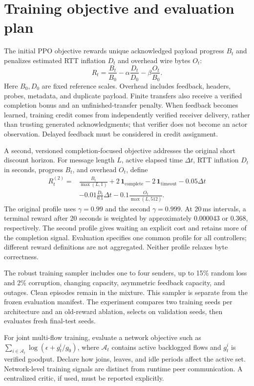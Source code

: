 \documentclass[11pt]{article}
\begin{document}
\section{Training objective and evaluation plan}
The initial PPO objective rewards unique acknowledged payload progress $B_t$
and penalizes estimated RTT inflation $D_t$ and overhead wire bytes $O_t$:
\begin{equation}
 R_t = \frac{B_t}{B_0}-\alpha\frac{D_t}{D_0}
       -\beta\frac{O_t}{B_0}.
\end{equation}
Here $B_0,D_0$ are fixed reference scales. Overhead includes feedback,
headers, probes, metadata, and duplicate payload. Finite transfers also receive
a verified completion bonus and an unfinished-transfer penalty. When feedback
becomes learned, training credit comes from independently verified receiver
delivery, rather than trusting generated acknowledgments; that verifier does
not become an actor observation. Delayed feedback must be considered in credit
assignment.

A second, versioned completion-focused objective addresses the original short
discount horizon. For message length $L$, active elapsed time $\Delta t$, RTT
inflation $D_t$ in seconds, progress $B_t$, and overhead $O_t$, define
\begin{align}
 R_t^{(2)} ={}& \frac{B_t}{\max(L,1)}
 + 2\,\mathbf{1}_{\mathrm{complete}} - 2\,\mathbf{1}_{\mathrm{timeout}}
 - 0.05\Delta t \nonumber\\
 &-0.01\frac{D_t}{0.1}\Delta t
 -0.1\frac{O_t}{\max(L,512)}.
\end{align}
The original profile uses $\gamma=0.99$ and the second $\gamma=0.999$. At
20\,ms intervals, a terminal reward after 20 seconds is weighted by approximately
$0.000043$ or $0.368$, respectively. The second profile gives waiting an explicit
cost and retains more of the completion signal. Evaluation specifies one common
profile for all controllers; different reward definitions are not aggregated.
Neither profile relaxes byte correctness.

The robust training sampler includes one to four senders, up to 15\% random loss
and 2\% corruption, changing capacity, asymmetric feedback capacity, and outages.
Clean episodes remain in the mixture. This sampler is separate from the frozen
evaluation manifest. The experiment compares two training seeds per architecture
and an old-reward ablation, selects on validation seeds, then evaluates fresh
final-test seeds.

For joint multi-flow training, evaluate a network objective such as
$\sum_{i\in\mathcal{A}_t}\log(\epsilon+g_t^i/g_0)$, where
$\mathcal{A}_t$ contains active backlogged flows and $g_t^i$ is verified goodput.
Declare how joins, leaves, and idle periods affect the active set. Network-level
training signals are distinct from runtime peer communication. A centralized
critic, if used, must be reported explicitly.
\end{document}
